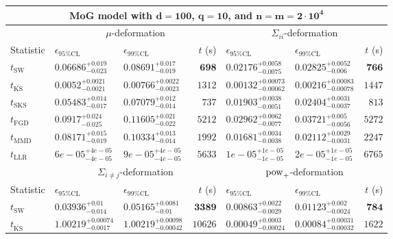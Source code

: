 \begin{tabular}{l|llr|llr}
	\toprule
	\multicolumn{7}{c}{{\bf MoG model with $\mathbf{d=100}$, $\mathbf{q=10}$, and $\mathbf{n=m=2\cdot 10^{4}}$}} \\
	\toprule
	\multicolumn{1}{c}{} & \multicolumn{3}{c}{$\mu$-deformation} & \multicolumn{3}{c}{$\Sigma_{ii}$-deformation} \\
	Statistic & $\epsilon_{95\%\mathrm{CL}}$ & $\epsilon_{99\%\mathrm{CL}}$ & $t$ (s) & $\epsilon_{95\%\mathrm{CL}}$ & $\epsilon_{99\%\mathrm{CL}}$ & $t$ (s) \\
	\midrule
	$t_{\mathrm{SW}}$ & $0.06686_{-0.023}^{+0.019}$ & $0.08691_{-0.019}^{+0.017}$ & ${\mathbf{698}}$ & $0.02176_{-0.0075}^{+0.0058}$ & $0.02825_{-0.006}^{+0.0052}$ & ${\mathbf{766}}$ \\
	$t_{\overline{\mathrm{KS}}}$ & ${\mathbf{0.0052_{-0.0021}^{+0.0021}}}$ & ${\mathbf{0.00766_{-0.0023}^{+0.0022}}}$ & $1312$ & ${\mathbf{0.00132_{-0.00062}^{+0.00073}}}$ & ${\mathbf{0.00216_{-0.00078}^{+0.00083}}}$ & $1447$ \\
	$t_{\mathrm{SKS}}$ & $0.05483_{-0.017}^{+0.014}$ & $0.07079_{-0.014}^{+0.012}$ & $737$ & $0.01903_{-0.0051}^{+0.0038}$ & $0.02404_{-0.0037}^{+0.0031}$ & $813$ \\
	$t_{\mathrm{FGD}}$ & $0.0917_{-0.025}^{+0.024}$ & $0.11605_{-0.022}^{+0.021}$ & $5212$ & $0.02962_{-0.0077}^{+0.0062}$ & $0.03721_{-0.0056}^{+0.005}$ & $5272$ \\
	$t_{\mathrm{MMD}}$ & $0.08171_{-0.019}^{+0.015}$ & $0.10334_{-0.014}^{+0.013}$ & $1992$ & $0.01681_{-0.0038}^{+0.0034}$ & $0.02112_{-0.0031}^{+0.0029}$ & $2247$ \\
	$t_{\mathrm{LLR}}$ & $6e-05_{-4e-05}^{+4e-05}$ & $9e-05_{-4e-05}^{+4e-05}$ & $5633$ & $1e-05_{-1e-05}^{+1e-05}$ & $2e-05_{-1e-05}^{+1e-05}$ & $6765$ \\
	\toprule
	\multicolumn{1}{c}{} & \multicolumn{3}{c}{$\Sigma_{i\neq j}$-deformation} & \multicolumn{3}{c}{$\rm{pow}_{+}$-deformation} \\
	Statistic & $\epsilon_{95\%\mathrm{CL}}$ & $\epsilon_{99\%\mathrm{CL}}$ & $t$ (s) & $\epsilon_{95\%\mathrm{CL}}$ & $\epsilon_{99\%\mathrm{CL}}$ & $t$ (s) \\
	\midrule
	$t_{\mathrm{SW}}$ & $0.03936_{-0.014}^{+0.01}$ & $0.05165_{-0.01}^{+0.0081}$ & ${\mathbf{3389}}$ & $0.00863_{-0.0029}^{+0.0022}$ & $0.01123_{-0.0024}^{+0.002}$ & ${\mathbf{784}}$ \\
	$t_{\overline{\mathrm{KS}}}$ & $1.00219_{-0.0017}^{+0.00074}$ & $1.00219_{-0.00042}^{+0.00098}$ & $10626$ & ${\mathbf{0.00049_{-0.00024}^{+0.0003}}}$ & ${\mathbf{0.00084_{-0.00032}^{+0.00031}}}$ & $1622$ \\

\end{tabular}
